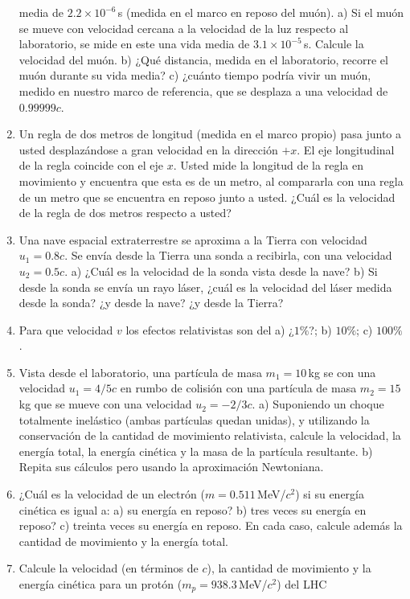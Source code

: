 \documentclass[a4paper,12pt]{article}
\begin{document}
\begin{enumerate}
		media de $2.2\times 10^{-6}$\,s (medida en el marco en reposo del
		muón). a) Si el muón se mueve con velocidad cercana a la velocidad de
		la luz respecto al laboratorio, se mide en este una vida media de
		$3.1\times 10^{-5}$\,s. Calcule la velocidad del muón. b) ¿Qué
		distancia, medida en el laboratorio, recorre el muón durante su vida
		media? c) ¿cuánto tiempo podría vivir un muón, medido en nuestro marco
		de referencia, que se desplaza a una velocidad de $0.99999c$.
	\item Un regla de dos metros de longitud (medida en el marco propio) pasa
		junto a usted desplazándose a gran velocidad en la dirección $+x$. El
		eje longitudinal de la regla coincide con el eje $x$. Usted mide la
		longitud de la regla en movimiento y encuentra que esta es de un metro,
		al compararla con una regla de un metro que se encuentra en reposo
		junto a usted. ¿Cuál es la velocidad de la regla de dos metros respecto
		a usted?
	\item Una nave espacial extraterrestre se aproxima a la Tierra con
		velocidad $u_1=0.8c$. Se envía desde la Tierra una sonda a recibirla,
		con una velocidad $u_2=0.5c$. a) ¿Cuál es la velocidad de la sonda
		vista desde la nave? b) Si desde la sonda se envía un rayo láser, ¿cuál
		es la velocidad del láser medida desde la sonda? ¿y desde la nave? ¿y
		desde la Tierra?
	\item Para que velocidad $v$ los efectos relativistas son del a) ¿$1\%$?;
		b) $10\%$; c) $100\%$.
	\item Vista desde el laboratorio, una partícula de masa $m_1=10$\,kg se con
		una velocidad $u_1=4/5 c$ en rumbo de colisión con una partícula de
		masa $m_2=15$\,kg que se mueve con una velocidad $u_2=-2/3c$. a)
		Suponiendo un choque totalmente inelástico (ambas partículas quedan
		unidas), y utilizando la conservación de la cantidad de movimiento
		relativista, calcule la velocidad, la energía total, la energía
		cinética y la masa de la partícula resultante. b) Repita sus cálculos
		pero usando la aproximación Newtoniana. 
	\item ¿Cuál es la velocidad de un electrón ($m=0.511$\,MeV/$c^2$) si su
		energía cinética es igual a: a) su energía en reposo? b) tres veces su
		energía en reposo?  c) treinta veces su energía en reposo. En cada
		caso, calcule además la cantidad de movimiento y la energía total. 
	\item Calcule la velocidad (en términos de $c$), la cantidad de movimiento
		y la energía cinética para un protón ($m_p=938.3$\,MeV/$c^2$) del LHC

\end{enumerate}
\end{document}
